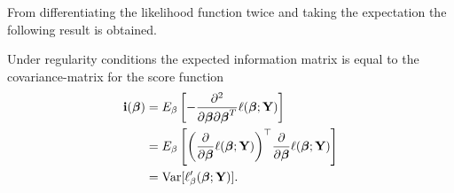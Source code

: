 From differentiating the likelihood function twice and taking the expectation the following result is obtained.

\begin{lemma}
\label{lem:fisher_information_matrix}
Under regularity conditions the expected information matrix is equal to the covariance-matrix for the score function
\begin{align*}
    \textbf{i}(\boldsymbol{\beta}) &= E_{\beta}\left[- \frac{\partial^2}{\partial \boldsymbol{\beta} \partial \boldsymbol{\beta}^T} \ell(\boldsymbol{\beta}; \textbf{Y})\right] \\
    &= E_{\beta}\left[ \bigg( \frac{\partial}{\partial \boldsymbol{\beta}}\ell(\boldsymbol{\beta};\textbf{Y}) \bigg)^\top \frac{\partial}{\partial \boldsymbol{\beta}}\ell(\boldsymbol{\beta};\textbf{Y})\right] \\
    &= \operatorname{\text{Var}} [\ell_\beta ' (\boldsymbol{\beta}; \textbf{Y})].
\end{align*}
\end{lemma}

